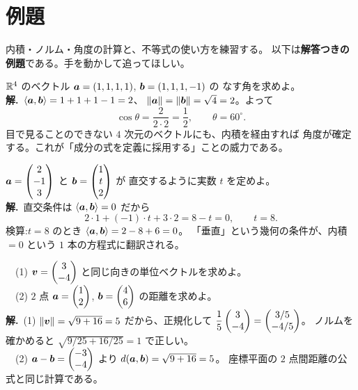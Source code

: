 \section{例題}

内積・ノルム・角度の計算と、不等式の使い方を練習する。
以下は\textbf{解答つきの例題}である。手を動かして追ってほしい。

\begin{rei}[例題・基本(計算)]\label{rei:inner-angle}
$\mathbb{R}^4$ のベクトル $\bm{a} = (1, 1, 1, 1)$, $\bm{b} = (1, 1, 1, -1)$ の
なす角を求めよ。\\
\textbf{解.}\ $\langle \bm{a}, \bm{b} \rangle = 1 + 1 + 1 - 1 = 2$、
$\|\bm{a}\| = \|\bm{b}\| = \sqrt{4} = 2$。よって
\[
\cos\theta = \frac{2}{2 \cdot 2} = \frac{1}{2}, \qquad \theta = 60^\circ.
\]
目で見ることのできない $4$ 次元のベクトルにも、内積を経由すれば
角度が確定する。これが「成分の式を定義に採用する」ことの威力である。
\end{rei}

\begin{rei}[例題・基本(直交条件)]\label{rei:inner-orthparam}
$\bm{a} = \begin{pmatrix}2 \\ -1 \\ 3\end{pmatrix}$ と $\bm{b} = \begin{pmatrix}1 \\ t \\ 2\end{pmatrix}$ が
直交するように実数 $t$ を定めよ。\\
\textbf{解.}\ 直交条件は $\langle \bm{a}, \bm{b} \rangle = 0$ だから
\[
2 \cdot 1 + (-1) \cdot t + 3 \cdot 2 = 8 - t = 0, \qquad t = 8.
\]
検算:$t = 8$ のとき $\langle \bm{a}, \bm{b} \rangle = 2 - 8 + 6 = 0$。
「垂直」という幾何の条件が、内積 $= 0$ という $1$ 本の方程式に翻訳される。
\end{rei}

\begin{rei}[例題・基本(単位ベクトルと距離)]\label{rei:inner-normdist}
　(1) $\bm{v} = \begin{pmatrix}3 \\ -4\end{pmatrix}$ と同じ向きの単位ベクトルを求めよ。\\
　(2) $2$ 点 $\bm{a} = \begin{pmatrix}1 \\ 2\end{pmatrix}$, $\bm{b} = \begin{pmatrix}4 \\ 6\end{pmatrix}$ の距離を求めよ。\\
\textbf{解.}\ (1) $\|\bm{v}\| = \sqrt{9 + 16} = 5$ だから、正規化して
$\dfrac{1}{5}\begin{pmatrix}3 \\ -4\end{pmatrix} = \begin{pmatrix}3/5 \\ -4/5\end{pmatrix}$。
ノルムを確かめると $\sqrt{9/25 + 16/25} = 1$ で正しい。\\
　(2) $\bm{a} - \bm{b} = \begin{pmatrix}-3 \\ -4\end{pmatrix}$ より
$d(\bm{a}, \bm{b}) = \sqrt{9 + 16} = 5$。
座標平面の $2$ 点間距離の公式と同じ計算である。
\end{rei}

